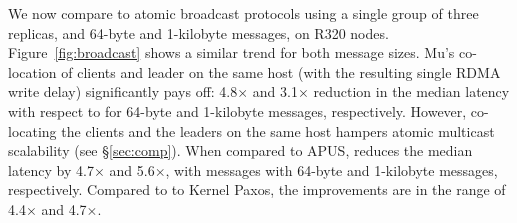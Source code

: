 We now compare \libname to atomic broadcast protocols using a single group of three replicas, and 64-byte and 1-kilobyte messages, on R320 nodes.
Figure~\ref{fig:broadcast} shows a similar trend for both message sizes.
Mu's co-location of clients and leader on the same host (with the resulting single RDMA write delay) significantly pays off:
4.8$\times$ and 3.1$\times$ reduction in the median latency with respect to \libname for 64-byte and 1-kilobyte messages, respectively.
However, co-locating the clients and the leaders on the same host hampers atomic multicast scalability (see \S\ref{sec:comp}).
When compared to APUS, \libname reduces the median latency by 4.7$\times$ and 5.6$\times$, with messages with 64-byte and 1-kilobyte messages, respectively.
Compared to to Kernel Paxos, the improvements are in the range of 4.4$\times$ and 4.7$\times$.




